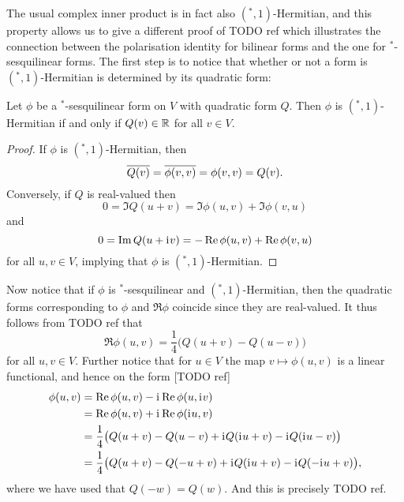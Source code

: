The usual complex inner product is in fact also $({}^*,1)$-Hermitian, and this property allows us to give a different proof of TODO ref which illustrates the connection between the polarisation identity for bilinear forms and the one for ${}^*$-sesquilinear forms. The first step is to notice that whether or not a form is $({}^*,1)$-Hermitian is determined by its quadratic form:
%
\begin{lemma}
    Let $\phi$ be a ${}^*$-sesquilinear form on $V$ with quadratic form $Q$. Then $\phi$ is $({}^*,1)$-Hermitian if and only if $Q(v) \in \mathbb{R}$ for all $v \in V$.
\end{lemma}

\begin{proof}
    If $\phi$ is $({}^*,1)$-Hermitian, then
    \begin{equation*}
        \conj{Q(v)}
            = \conj{\phi(v,v)}
            = \phi(v,v)
            = Q(v).
    \end{equation*}
    Conversely, if $Q$ is real-valued then
    \begin{equation*}
        0
            = \Im Q(u+v)
            = \Im \phi(u,v) + \Im \phi(v,u)
    \end{equation*}
    and
    \begin{equation*}
        0
            = \Im Q(u+\iu v)
            = - \Re \phi(u,v) + \Re \phi(v,u)
    \end{equation*}
    for all $u,v \in V$, implying that $\phi$ is $({}^*,1)$-Hermitian.
\end{proof}
%
Now notice that if $\phi$ is ${}^*$-sesquilinear and $({}^*,1)$-Hermitian, then the quadratic forms corresponding to $\phi$ and $\Re \phi$ coincide since they are real-valued. It thus follows from TODO ref that
%
\begin{equation*}
    \Re \phi(u,v)
        = \frac{1}{4} \bigl( Q(u+v) - Q(u-v) \bigr)
\end{equation*}
%
for all $u,v \in V$. Further notice that for $u \in V$ the map $v \mapsto \phi(u,v)$ is a linear functional, and hence on the form [TODO ref]
%
\begin{align*}
    \phi(u,v)
        &= \Re \phi(u,v) - \iu \Re \phi(u, \iu v) \\
        &= \Re \phi(u,v) + \iu \Re \phi(\iu u, v) \\
        &= \frac{1}{4} \bigl( Q(u+v) - Q(u-v) + \iu Q(\iu u + v) - \iu Q(\iu u - v) \bigr) \\
        &= \frac{1}{4} \bigl( Q(u+v) - Q(-u+v) + \iu Q(\iu u + v) - \iu Q(-\iu u + v) \bigr),
\end{align*}
%
where we have used that $Q(-w) = Q(w)$. And this is precisely TODO ref.


